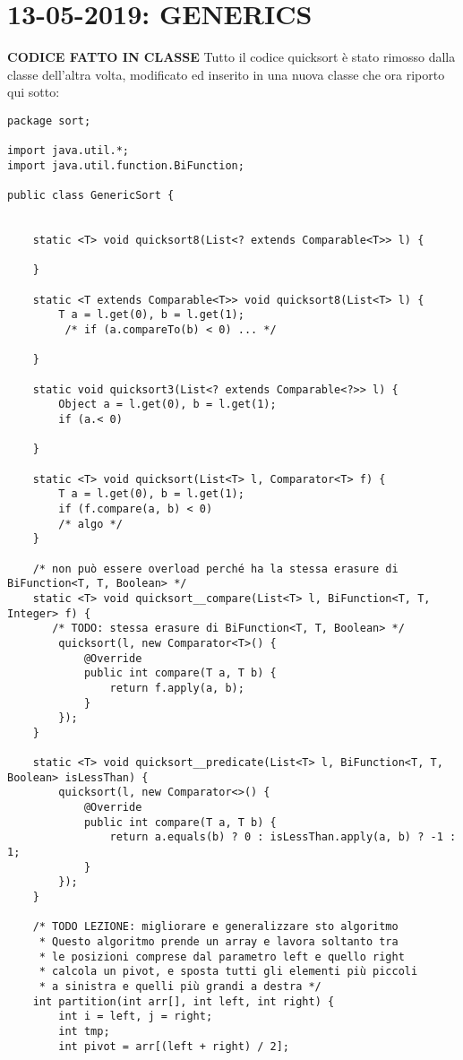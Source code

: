 

\newpage
\section{13-05-2019: GENERICS}
\noindent \textbf{CODICE FATTO IN CLASSE} \newline
Tutto il codice quicksort è stato rimosso dalla classe dell'altra volta, modificato ed inserito in una nuova classe che ora riporto qui sotto:
\begin{lstlisting}
package sort;

import java.util.*;
import java.util.function.BiFunction;

public class GenericSort {


    static <T> void quicksort8(List<? extends Comparable<T>> l) {

    }

    static <T extends Comparable<T>> void quicksort8(List<T> l) {
        T a = l.get(0), b = l.get(1);
         /* if (a.compareTo(b) < 0) ... */

    }

    static void quicksort3(List<? extends Comparable<?>> l) {
        Object a = l.get(0), b = l.get(1);
        if (a.< 0)

    }

    static <T> void quicksort(List<T> l, Comparator<T> f) {
        T a = l.get(0), b = l.get(1);
        if (f.compare(a, b) < 0)
        /* algo */
    }

	/* non può essere overload perché ha la stessa erasure di BiFunction<T, T, Boolean> */
    static <T> void quicksort__compare(List<T> l, BiFunction<T, T, Integer> f) { 
       /* TODO: stessa erasure di BiFunction<T, T, Boolean> */
        quicksort(l, new Comparator<T>() {
            @Override
            public int compare(T a, T b) {
                return f.apply(a, b);
            }
        });
    }

    static <T> void quicksort__predicate(List<T> l, BiFunction<T, T, Boolean> isLessThan) {
        quicksort(l, new Comparator<>() {
            @Override
            public int compare(T a, T b) {
                return a.equals(b) ? 0 : isLessThan.apply(a, b) ? -1 : 1;
            }
        });
    }

    /* TODO LEZIONE: migliorare e generalizzare sto algoritmo 
     * Questo algoritmo prende un array e lavora soltanto tra
     * le posizioni comprese dal parametro left e quello right
     * calcola un pivot, e sposta tutti gli elementi più piccoli 
     * a sinistra e quelli più grandi a destra */
    int partition(int arr[], int left, int right) {
        int i = left, j = right;
        int tmp;
        int pivot = arr[(left + right) / 2];


\end{lstlisting}
